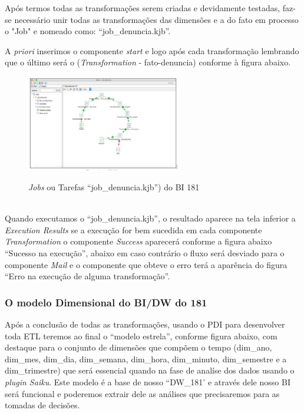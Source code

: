 Ap\'os termos todas as transforma\c{c}\~{o}es serem criadas e devidamente testadas, faz-se necess\'{a}rio unir todas as transforma\c{c}\~{o}es das dimens\~{o}es e a do fato em processo o "Job" e nomeado como: ``job\_denuncia.kjb''. 

A \textit{priori} inserimos o componente \textit{start} e logo ap\'os cada transforma\c{c}\~{a}o lembrando que o último ser\'{a} o (\textit{Transformation} - fato-denuncia) conforme \`{a} figura abaixo.

\begin{figure}[H]
	\vspace*{0,2cm}
    \centering
    \caption{\textit{Jobs} ou Tarefas ``job\_denuncia.kjb'') do BI 181}
    \includegraphics[width=0.6\textwidth]{./04-figuras/figura-job}
    \label{fig:ilustfigjob}
\end{figure}
\vspace*{-0,9cm}
{\raggedright {}} \\

Quando executamos o ``job\_denuncia.kjb'', o resultado aparece na tela inferior a \textit{Execution Results} se a execu\c{c}\~{a}o for bem sucedida em cada componente \textit{Transformation} o  componente \textit{Success} aparecer\'{a} conforme a figura abaixo ``Sucesso na execu\c{c}\~{a}o'', abaixo em caso contr\'{a}rio o fluxo ser\'{a} desviado para o componente \textit{Mail} e o componente que obteve o erro ter\'{a} a aparência do figura ``Erro na execu\c{c}\~{a}o de alguma transforma\c{c}\~{a}o''.

\subsubsection{O modelo Dimensional do BI/DW do 181}

Ap\'os a conclus\~{a}o de todas as transforma\c{c}\~{o}es, usando o PDI para desenvolver toda ETL teremos ao final o ``modelo estrela'', conforme figura abaixo, com destaque para o conjunto de dimens\~{o}es que comp\~{o}em o tempo (dim\_ano, dim\_mes, dim\_dia, dim\_semana, dim\_hora, dim\_minuto, dim\_semestre e a dim\_trimestre) que ser\'{a} essencial quando na fase de analíse dos dados usando o \textit{plugin Saiku}. Este modelo \'{e} a base de nosso 
``DW\_181' e atrav\'{e}s dele nosso BI ser\'{a} funcional e poderemos extrair dele as an\'{a}lises que precisaremos para as tomadas de decis\~{o}es.

